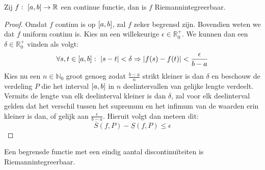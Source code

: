 \documentclass[main.tex]{subfiles}
\begin{document}
\begin{bpr}
  Zij $f:\ \interval{a}{b} \rightarrow \mathbb{R}$ een continue functie, dan is $f$ Riemannintegreerbaar.

  \begin{proof}
    Omdat $f$ continu is op $\interval{a}{b}$, zal $f$ zeker begrensd zijn.\needed
    Bovendien weten we dat $f$ uniform continu is.\needed
    Kies nu een willekeurige $\epsilon\in\mathbb{R}_{0}^{+}$.
    We kunnen dan een $\delta\in\mathbb{R}_{0}^{+}$ vinden als volgt:
    \[ \forall s,t\in\interval{a}{b}:\ |s-t| < \delta \Rightarrow \left|f(s)-f(t)\right| < \frac{\epsilon}{b-a} \]
    Kies nu een $n\in\mathbb{N}_{0}$ groot genoeg zodat $\frac{b-a}{n}$ strikt kleiner is dan $\delta$ en beschouw de verdeling $P$ die het interval $\interval{a}{b}$ in $n$ deelintervallen van gelijke lengte verdeelt.
    Vermits de lengte van elk deelinterval kleiner is dan $\delta$, zal voor elk deelinterval gelden dat het verschil tussen het supremum en het infimum van de waarden erin kleiner is dan, of gelijk aan $\frac{\epsilon}{b-a}$.
    Hieruit volgt dan meteen dit:
    \[ \overline{S}(f,P) - \underline{S}(f,P) \le \epsilon \]
  \end{proof}
\end{bpr}

\begin{st}
  Een begrensde functie met een eindig aantal discontinu\"iteiten is Riemannintegreerbaar.
\end{st}
\end{document}
